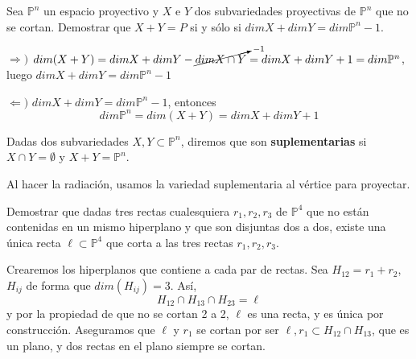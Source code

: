 \begin{ejer}[9]
    Sea $\mathbb P^n$ un espacio proyectivo y $X$ e $Y$ dos subvariedades proyectivas de $\mathbb P^n$ que no se cortan. Demostrar que $X + Y = P$ si y s\'olo si $dim X + dim Y = dim \mathbb P^n - 1$.
\end{ejer}
\begin{sol}
    $\Rightarrow)$ $dim (X+Y) = dim X + dim Y - \cancelto{-1}{dim X\cap Y} = dim X + dim Y + 1 = dim \mathbb P^n$, luego $dim X + dim Y = dim \mathbb P^n - 1$

    $\Leftarrow)$ $dim X + dim Y = dim \mathbb P^n - 1$, entonces
    $$dim \mathbb P^n = dim(X+Y)=dim X + dim Y + 1 $$
\end{sol}
\begin{defi}
    Dadas dos subvariedades $X, Y \subset \mathbb P^n$, diremos que son \textbf{suplementarias} si $X \cap Y = \emptyset$ y $X + Y = \mathbb P^n$.
\end{defi}
\begin{obs}
    Al hacer la radiaci\'on, usamos la variedad suplementaria al v\'ertice para proyectar.
\end{obs}
\begin{ejer}
    [13] Demostrar que dadas tres rectas cualesquiera $r_1, r_2, r_3$ de $\mathbb P^4$ que no est\'an contenidas en un mismo hiperplano y que son disjuntas dos a dos, existe una \'unica recta $\ell \subset \mathbb P^4$ que corta a las tres rectas $r_1, r_2, r_3$.
\end{ejer}
\begin{sol}
    Crearemos los hiperplanos que contiene a cada par de rectas. Sea $H_{12} = r_1 + r_2$, $H_{ij}$ de forma que $dim(H_{ij})=3$. As\'i, 
    $$H_{12} \cap H_{13} \cap H_{23} = \ell $$
    y por la propiedad de que no se cortan 2 a 2, $\ell$ es una recta, y es \'unica por construcci\'on. Aseguramos que $\ell$ y $r_1$ se cortan por ser $\ell, r_1 \subset H_{12} \cap H_{13}$, que es un plano, y dos rectas en el plano siempre se cortan.
\end{sol}

